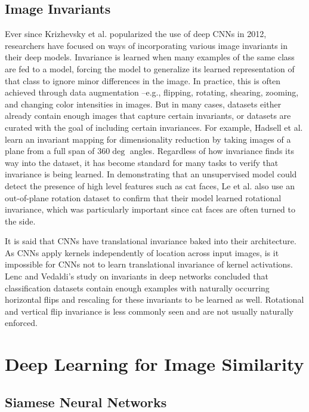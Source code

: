 \subsection{Image Invariants}
Ever since Krizhevsky et al. popularized the use of deep CNNs in 2012, researchers have focused on ways of incorporating various image invariants in their deep models. Invariance is learned when many examples of the same class are fed to a model, forcing the model to generalize its learned representation of that class to ignore minor differences in the image. In practice, this is often achieved through data augmentation --e.g., flipping, rotating, shearing, zooming, and changing color intensities in images. But in many cases, datasets either already contain enough images that capture certain invariants, or datasets are curated with the goal of including certain invariances. For example, Hadsell et al. learn an invariant mapping for dimensionality reduction by taking images of a plane from a full span of 360$\deg$ angles.\cite{hadsell2006dimensionality} Regardless of how invariance finds its way into the dataset, it has become standard for many tasks to verify that invariance is being learned. In demonstrating that an unsupervised model could detect the presence of high level features such as cat faces, Le et al. also use an out-of-plane rotation dataset to confirm that their model learned rotational invariance, which was particularly important since cat faces are often turned to the side.\cite{le2013building}

It is said that CNNs have translational invariance baked into their architecture. As CNNs apply kernels independently of location across input images, is it impossible for CNNs not to learn translational invariance of kernel activations. Lenc and Vedaldi's study on invariants in deep networks concluded that classification datasets contain enough examples with naturally occurring horizontal flips and rescaling for these invariants to be learned as well.\cite{vedaldi2010vlfeat} Rotational and vertical flip invariance is less commonly seen and are not usually naturally enforced.


\section{Deep Learning for Image Similarity}
\subsection{Siamese Neural Networks}

